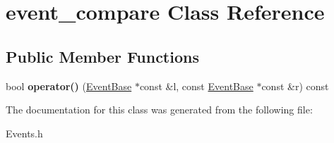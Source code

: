 \hypertarget{classevent__compare}{\section{event\-\_\-compare Class Reference}
\label{classevent__compare}
}
\subsection*{Public Member Functions}
\begin{DoxyCompactItemize}
\item 
\hypertarget{classevent__compare_aa518df542cf3237d52108959a623fddf}{bool {\bfseries operator()} (\hyperlink{class_event_base}{Event\-Base} $\ast$const \&l, const \hyperlink{class_event_base}{Event\-Base} $\ast$const \&r) const }\label{classevent__compare_aa518df542cf3237d52108959a623fddf}

\end{DoxyCompactItemize}


The documentation for this class was generated from the following file\-:\begin{DoxyCompactItemize}
\item 
Events.\-h\end{DoxyCompactItemize}
